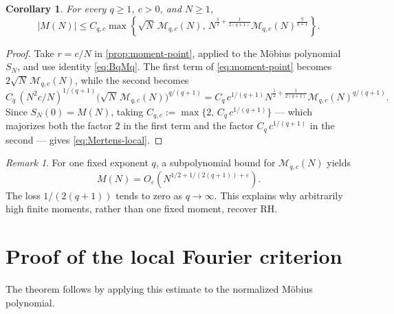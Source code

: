 \documentclass[11pt]{article}
\newtheorem{corollary}[theorem]{Corollary}
\theoremstyle{remark}
\newtheorem{remark}[theorem]{Remark}
\newcommand{\Mcal}{\mathcal M}
\begin{document}
\begin{corollary}\label{cor:Mertens-local}
For every \(q\geq1\), \(c>0\), and \(N\geq1\),
\begin{equation}\label{eq:Mertens-local}
 |M(N)|
 \leq C_{q,c}
 \max\left\{
 \sqrt N\,\Mcal_{q,c}(N),
 \,
 N^{\frac12+\frac{1}{2(q+1)}}
 \Mcal_{q,c}(N)^{\frac{q}{q+1}}
 \right\}.
\end{equation}
\end{corollary}

\begin{proof}
Take \(r=c/N\) in \cref{prop:moment-point}, applied to the Möbius
polynomial \(S_N\), and use identity \eqref{eq:BqMq}.  The first term
of \eqref{eq:moment-point} becomes \(2\sqrt N\,\Mcal_{q,c}(N)\), while
the second becomes
\[
 C_q\,(N^2c/N)^{1/(q+1)}
 \bigl(\sqrt N\,\Mcal_{q,c}(N)\bigr)^{q/(q+1)}
 =
 C_q\,c^{1/(q+1)}
 N^{\frac12+\frac{1}{2(q+1)}}
 \Mcal_{q,c}(N)^{q/(q+1)}.
\]
Since \(S_N(0)=M(N)\), taking
\(C_{q,c}:=\max\{2,\,C_q\,c^{1/(q+1)}\}\) --- which majorizes both the
factor \(2\) in the first term and the factor \(C_q\,c^{1/(q+1)}\) in
the second --- gives \eqref{eq:Mertens-local}.
\end{proof}

\begin{remark}
For one fixed exponent \(q\), a subpolynomial bound for
\(\Mcal_{q,c}(N)\) yields
\[
 M(N)=O_\varepsilon\left(
 N^{1/2+1/(2(q+1))+\varepsilon}
 \right).
\]
The loss \(1/(2(q+1))\) tends to zero as \(q\to\infty\).
This explains why arbitrarily high finite moments, rather than one
fixed moment, recover RH.
\end{remark}

\section{Proof of the local Fourier criterion}
\label{sec:fourier-proof}

The theorem follows by applying this estimate to the normalized Möbius polynomial.
\end{document}
